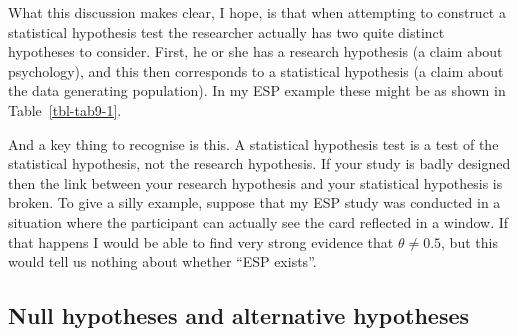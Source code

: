 \documentclass[
  a4paper,
]{book}
\begin{document}
What this discussion makes clear, I hope, is that when attempting to
construct a statistical hypothesis test the researcher actually has two
quite distinct hypotheses to consider. First, he or she has a research
hypothesis (a claim about psychology), and this then corresponds to a
statistical hypothesis (a claim about the data generating population).
In my ESP example these might be as shown in Table~\ref{tbl-tab9-1}.

\begin{table}

\caption{\label{tbl-tab9-1}Research and statistical hypotheses}

\centering
{}

\end{table}%

And a key thing to recognise is this. A statistical hypothesis test is a
test of the statistical hypothesis, not the research hypothesis. If your
study is badly designed then the link between your research hypothesis
and your statistical hypothesis is broken. To give a silly example,
suppose that my ESP study was conducted in a situation where the
participant can actually see the card reflected in a window. If that
happens I would be able to find very strong evidence that
\(\theta \neq 0.5\), but this would tell us nothing about whether ``ESP
exists''.

\subsection{Null hypotheses and alternative
hypotheses}\label{null-hypotheses-and-alternative-hypotheses}
\end{document}
